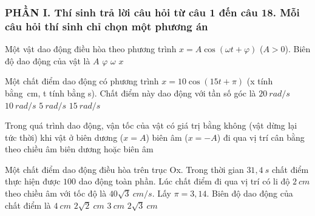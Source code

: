 \subsubsection*{PHẦN I. Thí sinh trả lời câu hỏi từ câu 1 đến câu 18. Mỗi câu hỏi thí sinh chỉ chọn một phương án}
\setcounter{ex}{0}
	\begin{ex} %
		Một vật dao động điều hòa theo phương trình $x = A\cos\left(\omega t + \varphi \right)$ ($A > 0$). Biên độ dao động của vật là
		\choice
		{\True $A$}
		{$\varphi$}
		{$\omega$}
		{$x$}
	\end{ex}
	\begin{ex} %
		Một chất điểm dao động có phương trình $x=10\cos\left(15t+\pi\right)$ (x tính bằng\ cm, t tính bằng s). Chất điểm này dao động với tần số góc là
		\choice
		{$20\ rad/s$}
		{$10\ rad/s$}
		{$5\ rad/s$}
		{\True $15\ rad/s$}
	\end{ex}
	\begin{ex}%
		Trong quá trình dao động, vận tốc của vật có giá trị bằng không (vật dừng lại tức thời) khi vật ở
		\choice
		{biên dương ($x = A$)}
		{biên âm ($x = -A$)}
		{đi qua vị trí cân bằng theo chiều âm}
		{\True biên dương hoặc biên âm}
	\end{ex}
	\begin{ex}%
		Một chất điểm dao động điều hòa trên trục Ox. Trong thời gian $31,4\ s$ chất điểm thực hiện được $100$ dao động toàn phần. Lúc chất điểm đi qua vị trí có li độ $2\ cm$ theo chiều âm với tốc độ là $40\sqrt{3}\ cm/s$. Lấy $\pi = 3,14$. Biên độ dao động của chất điểm là
		\choice 
		{\True $4\ cm$}
		{$2\sqrt{2}\ cm$}
		{$3\ cm$}
		{$2\sqrt{3}\ cm$}
	\end{ex}
